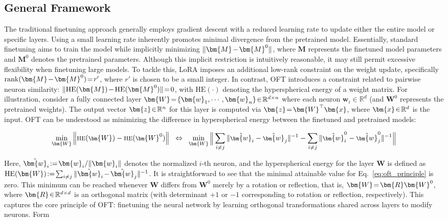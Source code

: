 \subsection{General Framework}

The traditional finetuning approach generally employs gradient descent with a reduced learning rate to update either the entire model or specific layers. Using a small learning rate inherently promotes minimal divergence from the pretrained model. Essentially, standard finetuning aims to train the model while implicitly minimizing $\thickmuskip=2mu \medmuskip=2mu \| \bm{M} - \bm{M}^0\|$, where $\bm{M}$ represents the finetuned model parameters and $\bm{M}^0$ denotes the pretrained parameters. Although this implicit restriction is intuitively reasonable, it may still permit excessive flexibility when finetuning large models. To tackle this, LoRA imposes an additional low-rank constraint on the weight update, specifically $\thickmuskip=2mu \medmuskip=2mu \text{rank}(\bm{M} - \bm{M}^0)=r'$, where $r'$ is chosen to be a small integer. In contrast, OFT introduces a constraint related to pairwise neuron similarity: $\thickmuskip=2mu \medmuskip=2mu \| \text{HE}(\bm{M})-\text{HE}(\bm{M}^0) \|=0$, with $\text{HE}(\cdot)$ denoting the hyperspherical energy of a weight matrix. For illustration, consider a fully connected layer $\thickmuskip=2mu \medmuskip=2mu \bm{W}=\{\bm{w}_1,\cdots,\bm{w}_n\} \in \mathbb{R}^{d \times n}$ where each neuron $\bm{w}_i \in \mathbb{R}^d$ (and $\bm{W}^0$ represents the pretrained weights). The output vector $\thickmuskip=2mu \medmuskip=2mu \bm{z} \in \mathbb{R}^n$ for this layer is computed via $\thickmuskip=2mu \medmuskip=2mu \bm{z} = \bm{W}^\top \bm{x}$, where $\thickmuskip=2mu \medmuskip=2mu \bm{x} \in \mathbb{R}^d$ is the input. OFT can be understood as minimizing the difference in hyperspherical energy between the finetuned and pretrained models:

\begin{equation}\label{eq:oft_principle}
\footnotesize
\min_{\bm{W}} \left\| \text{HE}(\bm{W}) - \text{HE}(\bm{W}^0) \right\| ~~\Leftrightarrow~~ \min_{\bm{W}} \bigg{\|} \sum_{i \neq j} \|\hat{\bm{w}}_i - \hat{\bm{w}}_j\|^{-1} - \sum_{i \neq j} \|\hat{\bm{w}}^0_i - \hat{\bm{w}}^0_j\|^{-1} \bigg{\|}
\end{equation}

Here, $\thickmuskip=2mu \medmuskip=2mu \hat{\bm{w}}_i := \bm{w}_i / \|\bm{w}_i\|$ denotes the normalized $i$-th neuron, and the hyperspherical energy for the layer $\bm{W}$ is defined as $\thickmuskip=2mu \medmuskip=2mu \text{HE}(\bm{W}) := \sum_{i \neq j} \|\hat{\bm{w}}_i - \hat{\bm{w}}_j\|^{-1}$. It is straightforward to see that the minimal attainable value for Eq.~\eqref{eq:oft_principle} is zero. This minimum can be reached whenever $\bm{W}$ differs from $\bm{W}^0$ merely by a rotation or reflection, that is, $\thickmuskip=2mu \medmuskip=2mu \bm{W} = \bm{R} \bm{W}^0$, where $\thickmuskip=2mu \medmuskip=2mu \bm{R} \in \mathbb{R}^{d \times d}$ is an orthogonal matrix (with determinant $+1$ or $-1$ corresponding to rotation or reflection, respectively). This captures the core principle of OFT: finetuning the neural network by learning orthogonal transformations shared across layers to modify neurons. Form

